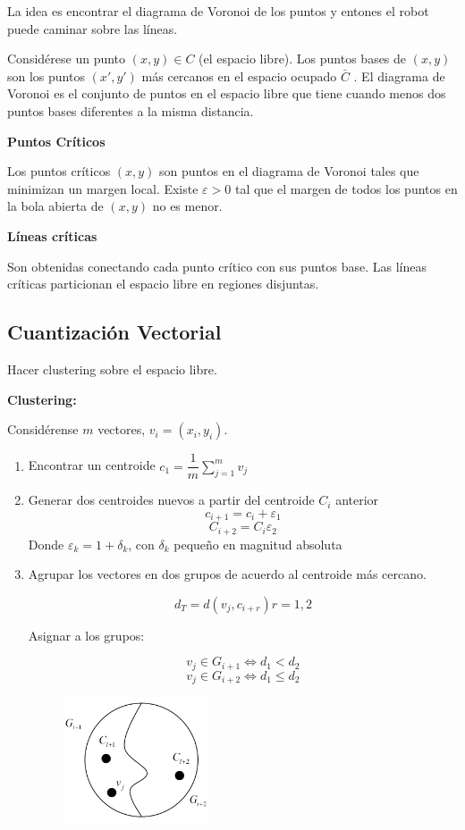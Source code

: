 La idea es encontrar el diagrama de Voronoi de los puntos y entones el robot puede caminar sobre las líneas.

Considérese un punto $(x,y) \in C$ (el espacio libre). Los puntos bases de $(x,y)$ son los puntos $(x',y')$ más
cercanos en el espacio ocupado $\bar{C}$ . El diagrama de Voronoi es el conjunto de puntos en el espacio libre que
tiene cuando menos dos puntos bases diferentes a la misma distancia.


\textbf{Puntos Críticos}

Los puntos críticos $(x,y)$ son puntos en el diagrama de Voronoi tales que minimizan un margen local.
Existe $\varepsilon > 0$  tal que el margen de todos los puntos en la bola abierta de $(x,y)$ no es menor.


\textbf{Líneas críticas}

Son obtenidas conectando cada punto crítico con sus puntos base. Las líneas críticas particionan el espacio
libre en regiones disjuntas.

\subsection{Cuantización Vectorial}

Hacer clustering sobre el espacio libre.

\textbf{Clustering:}

Considérense $m$ vectores, $v_i = (x_i , y_i).$

\begin{enumerate}[1.]
	\item Encontrar un centroide $c_1 = \dfrac{1}{m} \sum_{j=1}^{m} v_j$
	
	\item Generar dos centroides nuevos a partir del centroide $C_i$ anterior
	$$c_{i+1} = c_i + \varepsilon_1$$
	$$C_{i+2} = C_i \varepsilon_2$$
	Donde $\varepsilon_k = 1 + \delta_k$, con $\delta_k$ pequeño en magnitud absoluta
	\item Agrupar los vectores en dos grupos de acuerdo al centroide más cercano.
	
	$$d_T = d(v_j , c_{i+r})    r=1,2$$
	
	\begin{center}
		Asignar a los grupos:
	\end{center}
	$$v_j \in G_{i+1}\Leftrightarrow d_1 < d_2$$
	$$v_j \in G_{i+2}\Leftrightarrow d_1 \leq d_2$$
	\begin{figure}[h!]
		\centering
		\includegraphics[width=0.4\textwidth]{images/img100.png}
		\label{figura100}
	\end{figure}

\end{enumerate}
	\break



